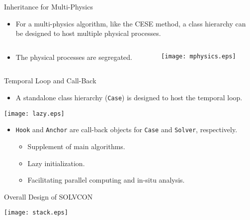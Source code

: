 \documentclass[dvips,xcolor=pst,14pt]{beamer}
\begin{document}
\begin{frame}{
%
Inheritance for Multi-Physics
%
}
\begin{itemize}
  \item For a multi-physics algorithm, like the CESE method, a class hierarchy
  can be designed to host multiple physical processes.
\end{itemize}
\begin{columns}[c]
\begin{column}{.5\textwidth}
\begin{itemize}
  \item The physical processes are segregated.
\end{itemize}
\end{column}
\begin{column}{.5\textwidth} \centering
  \texttt{[image: mphysics.eps]}
\end{column}
\end{columns}
\end{frame}

\begin{frame}{
%
Temporal Loop and Call-Back
%
}
\begin{itemize}
  \item A standalone class hierarchy (\texttt{Case}) is designed to host the
  \alert{temporal loop}.
\end{itemize}
\begin{center}
  \parbox{\textwidth}{\centering
  \texttt{[image: lazy.eps]}}
\end{center}
\begin{itemize}
  \item \texttt{Hook} and \texttt{Anchor} are call-back objects for
  \texttt{Case} and \texttt{Solver}, respectively.
  \begin{itemize}
    \item Supplement of main algorithms.
    \item Lazy initialization.
    \item Facilitating parallel computing and in-situ analysis.
  \end{itemize}
\end{itemize}
\end{frame}

\begin{frame}{
%
Overall Design of SOLVCON
%
}
\begin{center}
  \parbox{\textwidth}{\centering
  \texttt{[image: stack.eps]}}
\end{center}
\end{frame}
\end{document}
